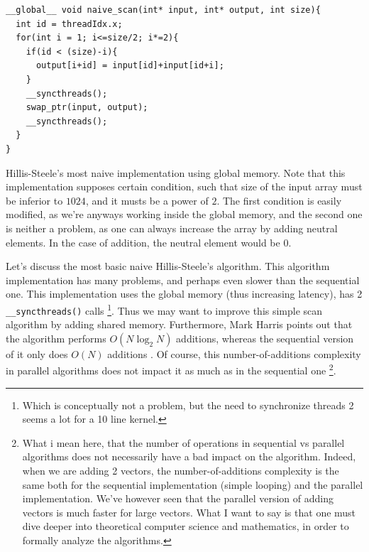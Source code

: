 \begin{listing}
\begin{verbatim}
__global__ void naive_scan(int* input, int* output, int size){
  int id = threadIdx.x;
  for(int i = 1; i<=size/2; i*=2){
    if(id < (size)-i){
      output[i+id] = input[id]+input[id+i];
    }
    __syncthreads();
    swap_ptr(input, output);
    __syncthreads();
  }
}
\end{verbatim}
\label{listing:hillis_steele}
\caption{Hillis-Steele's most naive implementation using global memory. Note that this implementation 
supposes certain condition, such that size of the input array must be inferior to $1024$, and it musts be a power of $2$. 
The first condition is easily modified, as we're anyways working inside the global memory, and the second one is neither a problem, 
as one can always increase the array by adding neutral elements. In the case of addition, the neutral element would be 0.}
\end{listing}

Let's discuss the most basic naive Hillis-Steele's algorithm. This algorithm implementation 
has many problems, and perhaps even slower than the sequential one. 
This implementation uses the global memory (thus increasing latency), has 2 \verb|__syncthreads()| 
calls \footnote{Which is conceptually not a problem, but the need to synchronize threads 2 seems a lot for a 10 line kernel.}. 
Thus we may want to improve this simple scan algorithm by adding shared memory. 
Furthermore, Mark Harris points out that the algorithm performs 
$O(N\log_2N)$ additions, whereas the sequential version of it only does $O(N)$ additions \cite{harris_parallel_2007}. Of course, this 
number-of-additions complexity in parallel algorithms does not impact it as much as in the sequential one 
\footnote{What i mean here, that the number of operations in sequential vs parallel algorithms does not necessarily have a bad impact 
on the algorithm. Indeed, when we are adding 2 vectors, the number-of-additions complexity is the same both for the sequential implementation (simple looping) 
and the parallel implementation. We've however seen that the parallel version of adding vectors is much faster for large vectors. What I want to say 
is that one must dive deeper into theoretical computer science and mathematics, in order to formally analyze the algorithms.}.

